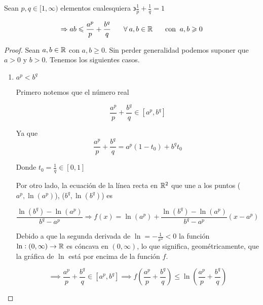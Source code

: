 \begin{lemma} \label{lema1}
    Sean $p,q \in [1,\infty)$ elementos cualesquiera $\backepsilon \frac{1}{p}+\frac{1}{q} = 1$

    \begin{equation*}
        \Rightarrow ab \leqslant \frac{a^p}{p}+ \frac{b^q}{q} \: \: \: \: \: \: \: \: \forall \: a,b \in \mathbb{R} \:  \: \: \: \: \: \: \: \text{con } \:  a,b \geqslant 0
    \end{equation*}
\end{lemma}

\begin{proof}
    Sean $a,b \in \mathbb{R}$ con $a,b \geqslant 0$. Sin perder generalidad podemos suponer que $a > 0$ y $b > 0$. Tenemos los siguientes casos.

    \begin{enumerate}
        \item $a^p < b^q$

        Primero notemos que el número real 

        \begin{equation*}
            \frac{a^p}{p}+ \frac{b^q}{q} \in [a^p,b^q]
        \end{equation*}

        Ya que
        \begin{equation*}
            \frac{a^p}{p}+ \frac{b^q}{q} = a^p(1-t_0)+{b}^{q}{t}_{0}
        \end{equation*}

        Donde $t_0 = \frac{1}{q} \in [0,1]$

        Por otro lado, la ecuación de la línea recta en $\mathbb{R}^2$ que une a los puntos ($a^p,\ln(a^p)$), ($b^q,\ln(b^q)$) es 

        \begin{equation*}
            \frac{\ln(b^q)-\ln(a^p)}{b^q-a^p} \Rightarrow f(x) = \ln(a^p)+ \frac{\ln(b^q)-\ln(a^p)}{b^q-a^p} (x-a^p)
        \end{equation*}

        Debido a que la segunda derivada de $\ln = - \frac{1}{x^2} < 0 $ la función $\ln : (0,\infty) \to \mathbb{R}$ es cóncava en $(0,\infty)$, lo que significa, geométricamente, que la gráfica de $\ln$ está por encima de la función $f$.

        \begin{equation*}
            \implies \frac{a^p}{p}+ \frac{b^q}{q} \in [a^p,b^q] \implies f\left( \frac{a^p}{p}+ \frac{b^q}{q} \right) \leqslant \ln( \frac{a^p}{p}+ \frac{b^q}{q})
        \end{equation*}


\end{enumerate}
\end{proof}
